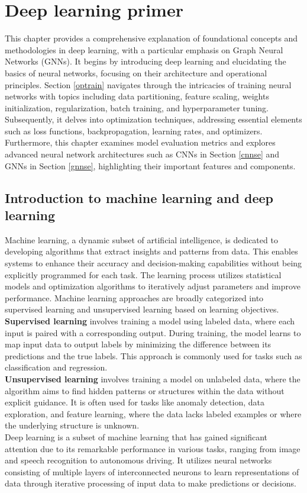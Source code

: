 \chapter{Deep learning primer}
\label{chap:Theory-Deep Learning}
This chapter provides a comprehensive explanation of foundational concepts and methodologies in deep learning, with a particular emphasis on Graph Neural Networks (GNNs). It begins by introducing deep learning and elucidating the basics of neural networks, focusing on their architecture and operational principles. Section \ref{optrain} navigates through the intricacies of training neural networks with topics including data partitioning, feature scaling, weights initialization, regularization, batch training, and hyperparameter tuning. Subsequently, it delves into optimization techniques, addressing essential elements such as loss functions, backpropagation, learning rates, and optimizers. Furthermore, this chapter examines model evaluation metrics and explores advanced neural network architectures such as CNNs in Section \ref{cnnse} and GNNs in Section \ref{gnnse}, highlighting their important features and components. 
\section{Introduction to machine learning and deep learning}
Machine learning, a dynamic subset of artificial intelligence, is dedicated to developing algorithms that extract insights and patterns from data. This enables systems to enhance their accuracy and decision-making capabilities without being explicitly programmed for each task. The learning process utilizes statistical models and optimization algorithms to iteratively adjust parameters and improve performance. Machine learning approaches are broadly categorized into supervised learning and unsupervised learning based on learning objectives. \\
\textbf{Supervised learning} involves training a model using labeled data, where each input is paired with a corresponding output. During training, the model learns to map input data to output labels by minimizing the difference between its predictions and the true labels. This approach is commonly used for tasks such as classification and regression. \\
\textbf{Unsupervised learning} involves training a model on unlabeled data, where the algorithm aims to find hidden patterns or structures within the data without explicit guidance. It is often used for tasks like anomaly detection, data exploration, and feature learning, where the data lacks labeled examples or where the underlying structure is unknown. \\
Deep learning is a subset of machine learning that has gained significant attention due to its remarkable performance in various tasks, ranging from image and speech recognition to autonomous driving. It utilizes neural networks consisting of multiple layers of interconnected neurons to learn representations of data through iterative processing of input data to make predictions or decisions. 
